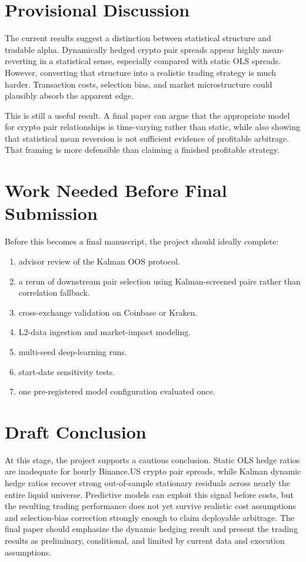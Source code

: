 \documentclass[11pt]{article}
\begin{document}
\section{Provisional Discussion}

The current results suggest a distinction between statistical structure and
tradable alpha. Dynamically hedged crypto pair spreads appear highly
mean-reverting in a statistical sense, especially compared with static OLS
spreads. However, converting that structure into a realistic trading strategy
is much harder. Transaction costs, selection bias, and market microstructure
could plausibly absorb the apparent edge.

This is still a useful result. A final paper can argue that the appropriate
model for crypto pair relationships is time-varying rather than static, while
also showing that statistical mean reversion is not sufficient evidence of
profitable arbitrage. That framing is more defensible than claiming a finished
profitable strategy.

\section{Work Needed Before Final Submission}

Before this becomes a final manuscript, the project should ideally complete:
\begin{enumerate}
\item advisor review of the Kalman OOS protocol.
\item a rerun of downstream pair selection using Kalman-screened pairs rather
than correlation fallback.
\item cross-exchange validation on Coinbase or Kraken.
\item L2-data ingestion and market-impact modeling.
\item multi-seed deep-learning runs.
\item start-date sensitivity tests.
\item one pre-registered model configuration evaluated once.
\end{enumerate}

\section{Draft Conclusion}

At this stage, the project supports a cautious conclusion. Static OLS hedge
ratios are inadequate for hourly Binance.US crypto pair spreads, while Kalman
dynamic hedge ratios recover strong out-of-sample stationary residuals across
nearly the entire liquid universe. Predictive models can exploit this signal
before costs, but the resulting trading performance does not yet survive
realistic cost assumptions and selection-bias correction strongly enough to
claim deployable arbitrage. The final paper should emphasize the dynamic
hedging result and present the trading results as preliminary, conditional,
and limited by current data and execution assumptions.
\end{document}
